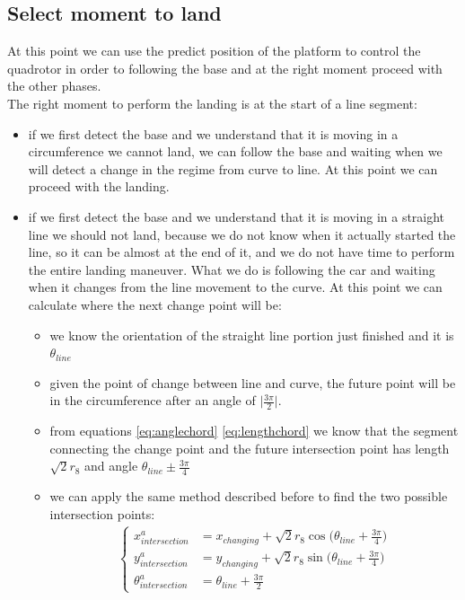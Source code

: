 \subsection{Select moment to land}
At this point we can use the predict position of the platform to control the quadrotor in order to following the base and at the right moment proceed with the other phases.\\
The right moment to perform the landing is at the start of a line segment:
\begin{itemize}
\item if we first detect the base and we understand that it is moving in a circumference we cannot land, we can follow the base and waiting when we will detect a change in the regime from curve to line. At this point we can proceed with the landing.
\item if we first detect the base and we understand that it is moving in a straight line we should not land, because we do not know when it actually started the line, so it can be almost at the end of it, and we do not have time to perform the entire landing maneuver. What we do is following the car and waiting when it changes from the line movement to the curve. At this point we can calculate where the next change point will be:
\begin{itemize}
\item we know the orientation of the straight line portion just finished and it is $\theta_{line}$
\item given the point of change between line and curve, the future point will be in the circumference after an angle of $\big | \frac{3\pi}{2} \big |$.
\item from equations \ref{eq:anglechord} \ref{eq:lengthchord} we know that the segment connecting the change point and the future intersection point has length $\sqrt{2}r_8$ and angle $\theta_{line} \pm \frac{3\pi}{4} $
\item we can apply the same method described before to find the two possible intersection points:
\begin{align}
\begin{cases}
x_{intersection}^a &= x_{changing} + \sqrt{2}r_8\cos{\Big(\theta_{line} + \frac{3\pi}{4}\Big) }\\
y_{intersection}^a &= y_{changing} + \sqrt{2}r_8\sin{\Big(\theta_{line} + \frac{3\pi}{4}\Big) }\\
\theta_{intersection}^a &=  \theta_{line} + \frac{3\pi}{2}
\label{eq:finalstatecurveb}
\end{cases}
\end{align}


\end{itemize}
\end{itemize}
